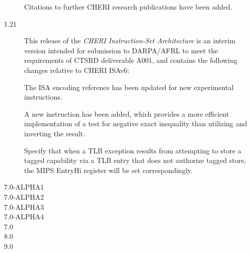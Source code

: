 \begin{description}
  Citations to further CHERI research publications have been added.

\item[1.21] This release of the \textit{CHERI Instruction-Set Architecture} is
  an interim version intended for submission to DARPA/AFRL to meet the
  requirements of CTSRD deliverable A001, and contains the following changes
  relative to CHERI ISAv6:

  The ISA encoding reference has been updated for new experimental
  instructions.

  A new  instruction has been added, which provides a
  more efficient implementation of a test for negative exact inequality than
  utilizing  and inverting the result.

  Specify that when a TLB exception results from attempting to store a
  tagged capability via a TLB entry that does not authorize tagged store, the
  MIPS EntryHi register will be set correspondingly.

\item[7.0-ALPHA1]


\item[7.0-ALPHA2]


\item[7.0-ALPHA3]


\item[7.0-ALPHA4]


\item[7.0]


\item[8.0]


\item[9.0]


\end{description}
